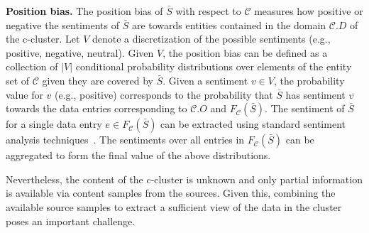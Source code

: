 \documentclass{sig-alternate}
\begin{document}
\vspace{3pt}\noindent\textbf{Position bias.} The position bias of $\bar{S}$ with respect to $\mathcal{C}$ measures how positive or negative the sentiments of $\bar{S}$ are towards entities contained in the domain $\mathcal{C}.D$ of the c-cluster. Let $V$ denote a discretization of the possible sentiments (e.g., positive, negative, neutral). Given $V$, the position bias can be defined as a collection of $|V|$ conditional probability distributions over elements of the entity set of $\mathcal{C}$ given they are covered by $\bar{S}$. Given a sentiment $v \in V$, the probability value for $v$ (e.g., positive) corresponds to the probability that $\bar{S}$ has sentiment $v$ towards the data entries corresponding to $\mathcal{C}.O$ and $F_{\mathcal{C}}(\bar{S})$. The sentiment of $\bar{S}$ for a single data entry $e \in F_{\mathcal{C}}(\bar{S})$ can be extracted using standard sentiment analysis techniques~\cite{pang:2002}. The sentiments over all entries in $F_{\mathcal{C}}(\bar{S})$ can be aggregated to form the final value of the above distributions.

\vspace{3pt} Nevertheless, the content of the c-cluster is unknown and only partial information is available via content samples from the sources. Given this,  combining the available source samples to extract a sufficient view of the data in the cluster poses an important challenge. 

\end{document}
